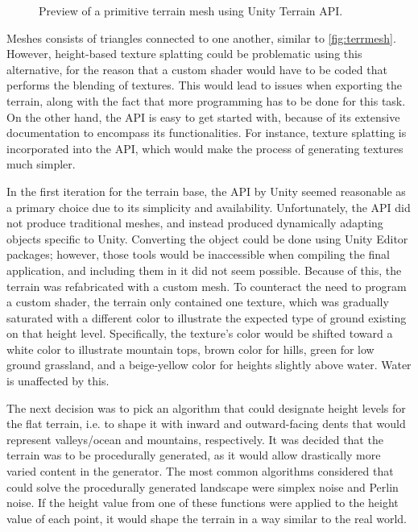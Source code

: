 \begin{figure}[H]
\begin{minipage}{.45\textwidth}
\begin{minipage}{.9\textwidth}
      \caption{Preview of a primitive terrain mesh using Unity Terrain API.}
      \label{fig:terrAPI}
    \end{minipage}
  \end{minipage}
\end{figure}

Meshes consists of triangles connected to one another, similar to \ref{fig:terrmesh}.
However, height-based texture splatting could be problematic using this alternative, for the reason that a custom shader would have to be coded that performs the blending of textures.
This would lead to issues when exporting the terrain, along with the fact that more programming has to be done for this task.
On the other hand, the API is easy to get started with, because of its extensive documentation to encompass its functionalities.
For instance, texture splatting is incorporated into the API, which would make the process of generating textures much simpler.

In the first iteration for the terrain base, the API by Unity seemed reasonable as a primary choice due to its simplicity and availability.
Unfortunately, the API did not produce traditional meshes, and instead produced dynamically adapting objects specific to Unity.
Converting the object could be done using Unity Editor packages; however, those tools would be inaccessible when compiling the final application, and including them in it did not seem possible.
Because of this, the terrain was refabricated with a custom mesh.
To counteract the need to program a custom shader, the terrain only contained one texture, which was gradually saturated with a different color to illustrate the expected type of ground existing on that height level.
Specifically, the texture's color would be shifted toward a white color to illustrate mountain tops, brown color for hills, green for low ground grassland, and a beige-yellow color for heights slightly above water.
Water is unaffected by this.

The next decision was to pick an algorithm that could designate height levels for the flat terrain, i.e. to shape it with inward and outward-facing dents that would represent valleys/ocean and mountains, respectively.
It was decided that the terrain was to be procedurally generated, as it would allow drastically more varied content in the generator.
The most common algorithms considered that could solve the procedurally generated landscape were simplex noise and Perlin noise.
If the height value from one of these functions were applied to the height value of each point, it would shape the terrain in a way similar to the real world.

